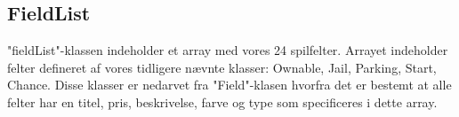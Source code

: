 \subsection{FieldList}
"fieldList"-klassen indeholder et array med vores 24 spilfelter. Arrayet indeholder felter defineret af vores tidligere nævnte klasser: Ownable, Jail, Parking, Start, Chance. Disse klasser er nedarvet fra "Field"-klasen hvorfra det er bestemt at alle felter har en titel, pris, beskrivelse, farve og type som specificeres i dette array.
